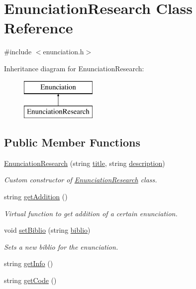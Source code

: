 \hypertarget{class_enunciation_research}{}\section{Enunciation\+Research Class Reference}
\label{class_enunciation_research}


{\ttfamily \#include $<$enunciation.\+h$>$}

Inheritance diagram for Enunciation\+Research\+:\begin{figure}[H]
\begin{center}
\leavevmode
\includegraphics[height=2.000000cm]{class_enunciation_research}
\end{center}
\end{figure}
\subsection*{Public Member Functions}
\begin{DoxyCompactItemize}
\item 
\hyperlink{class_enunciation_research_ac5d9450c0cdd0c2682e7b2ba35ca1258}{Enunciation\+Research} (string \hyperlink{class_enunciation_a5e2accd01df4c81578dc8f7b83507167}{title}, string \hyperlink{class_enunciation_a0b30051b66bd07b227f6a227befb6c0c}{description})
\begin{DoxyCompactList}\small\item\em Custom constructor of \hyperlink{class_enunciation_research}{Enunciation\+Research} class. \end{DoxyCompactList}\item 
string \hyperlink{class_enunciation_research_ad5021c15b3cf600191d21aec467529d4}{get\+Addition} ()
\begin{DoxyCompactList}\small\item\em Virtual function to get addition of a certain enunciation. \end{DoxyCompactList}\item 
void \hyperlink{class_enunciation_research_afc23a08d1cce9f77f64c664614f7a4fc}{set\+Biblio} (string \hyperlink{class_enunciation_research_a425da04eb657de83211819d1af3fc640}{biblio})
\begin{DoxyCompactList}\small\item\em Sets a new biblio for the enunciation. \end{DoxyCompactList}\item 
string \hyperlink{class_enunciation_research_a57ce30430703246bdd6a1103530a8a5f}{get\+Info} ()
\item 
string \hyperlink{class_enunciation_research_a424e392956c1c7bbccfdf74d72b3d4dd}{get\+Code} ()
\end{DoxyCompactItemize}
